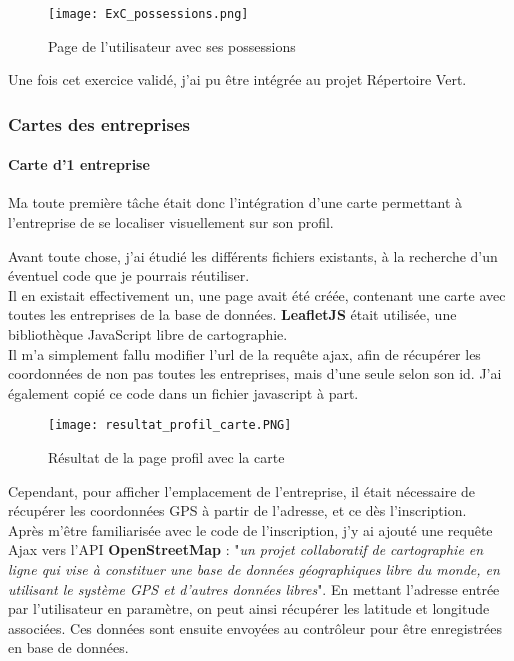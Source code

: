 \begin{figure}[H]
    \centering
    \texttt{[image: ExC\_possessions.png]}
    \caption{Page de l'utilisateur avec ses possessions}
\end{figure}

Une fois cet exercice validé, j'ai pu être intégrée au projet Répertoire Vert.


\subsubsection{Cartes des entreprises}

\paragraph{Carte d'1 entreprise}
Ma toute première tâche était donc l'intégration d'une carte permettant à l'entreprise de se localiser visuellement sur son profil.

Avant toute chose, j'ai étudié les différents fichiers existants, à la recherche d'un éventuel code que je pourrais réutiliser.
\\Il en existait effectivement un, une page avait été créée, contenant une carte avec toutes les entreprises de la base de données. \textbf{LeafletJS} était utilisée, une bibliothèque JavaScript libre de cartographie.
\\Il m'a simplement fallu modifier l'url de la requête ajax, afin de récupérer les coordonnées de non pas toutes les entreprises, mais d'une seule selon son id. J'ai également copié ce code dans un fichier javascript à part.

\begin{figure}[H]
    \centering
    \texttt{[image: resultat\_profil\_carte.PNG]}
    \caption{Résultat de la page profil avec la carte}
\end{figure}

Cependant, pour afficher l'emplacement de l'entreprise, il était nécessaire de récupérer les coordonnées GPS à partir de l'adresse, et ce dès l'inscription.\\
Après m'être familiarisée avec le code de l'inscription, j'y ai ajouté une requête Ajax vers l'API \textbf{OpenStreetMap} : "\emph{un projet collaboratif de cartographie en ligne qui vise à constituer une base de données géographiques libre du monde, en utilisant le système GPS et d'autres données libres}".
En mettant l'adresse entrée par l'utilisateur en paramètre, on peut ainsi récupérer les latitude et longitude associées. Ces données sont ensuite envoyées au contrôleur pour être enregistrées en base de données.

